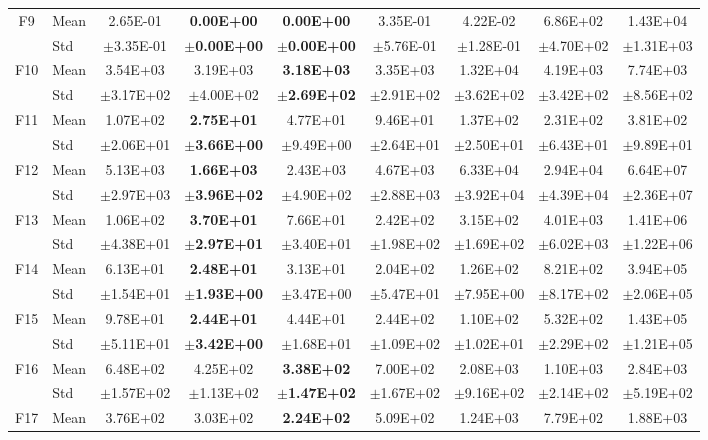 \begin{table}[htbp]
{\begin{tabular}{clccccccc}
F9 & Mean & 2.65E-01 & \textbf{0.00E+00} & \textbf{0.00E+00} & 3.35E-01 & 4.22E-02 & 6.86E+02 & 1.43E+04 \\
 & Std & $\pm$3.35E-01 & $\pm$\textbf{0.00E+00} & $\pm$\textbf{0.00E+00} & $\pm$5.76E-01 & $\pm$1.28E-01 & $\pm$4.70E+02 & $\pm$1.31E+03 \\
F10 & Mean & 3.54E+03 & 3.19E+03 & \textbf{3.18E+03} & 3.35E+03 & 1.32E+04 & 4.19E+03 & 7.74E+03 \\
 & Std & $\pm$3.17E+02 & $\pm$4.00E+02 & $\pm$\textbf{2.69E+02} & $\pm$2.91E+02 & $\pm$3.62E+02 & $\pm$3.42E+02 & $\pm$8.56E+02 \\
F11 & Mean & 1.07E+02 & \textbf{2.75E+01} & 4.77E+01 & 9.46E+01 & 1.37E+02 & 2.31E+02 & 3.81E+02 \\
 & Std & $\pm$2.06E+01 & $\pm$\textbf{3.66E+00} & $\pm$9.49E+00 & $\pm$2.64E+01 & $\pm$2.50E+01 & $\pm$6.43E+01 & $\pm$9.89E+01 \\
F12 & Mean & 5.13E+03 & \textbf{1.66E+03} & 2.43E+03 & 4.67E+03 & 6.33E+04 & 2.94E+04 & 6.64E+07 \\
 & Std & $\pm$2.97E+03 & $\pm$\textbf{3.96E+02} & $\pm$4.90E+02 & $\pm$2.88E+03 & $\pm$3.92E+04 & $\pm$4.39E+04 & $\pm$2.36E+07 \\
F13 & Mean & 1.06E+02 & \textbf{3.70E+01} & 7.66E+01 & 2.42E+02 & 3.15E+02 & 4.01E+03 & 1.41E+06 \\
 & Std & $\pm$4.38E+01 & $\pm$\textbf{2.97E+01} & $\pm$3.40E+01 & $\pm$1.98E+02 & $\pm$1.69E+02 & $\pm$6.02E+03 & $\pm$1.22E+06 \\
F14 & Mean & 6.13E+01 & \textbf{2.48E+01} & 3.13E+01 & 2.04E+02 & 1.26E+02 & 8.21E+02 & 3.94E+05 \\
 & Std & $\pm$1.54E+01 & $\pm$\textbf{1.93E+00} & $\pm$3.47E+00 & $\pm$5.47E+01 & $\pm$7.95E+00 & $\pm$8.17E+02 & $\pm$2.06E+05 \\
F15 & Mean & 9.78E+01 & \textbf{2.44E+01} & 4.44E+01 & 2.44E+02 & 1.10E+02 & 5.32E+02 & 1.43E+05 \\
 & Std & $\pm$5.11E+01 & $\pm$\textbf{3.42E+00} & $\pm$1.68E+01 & $\pm$1.09E+02 & $\pm$1.02E+01 & $\pm$2.29E+02 & $\pm$1.21E+05 \\
F16 & Mean & 6.48E+02 & 4.25E+02 & \textbf{3.38E+02} & 7.00E+02 & 2.08E+03 & 1.10E+03 & 2.84E+03 \\
 & Std & $\pm$1.57E+02 & $\pm$1.13E+02 & $\pm$\textbf{1.47E+02} & $\pm$1.67E+02 & $\pm$9.16E+02 & $\pm$2.14E+02 & $\pm$5.19E+02 \\
F17 & Mean & 3.76E+02 & 3.03E+02 & \textbf{2.24E+02} & 5.09E+02 & 1.24E+03 & 7.79E+02 & 1.88E+03 \\

\end{tabular}}
\end{table}
